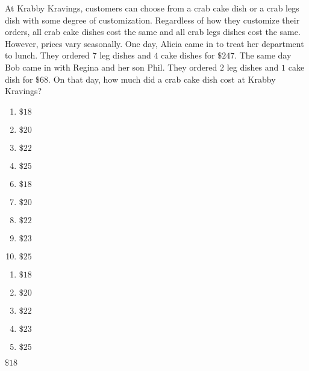  
At Krabby Kravings, customers can choose from a crab cake dish or a crab legs dish with some degree of customization.  Regardless of how they customize their orders, all crab cake dishes cost the same and all crab legs dishes cost the same.  However, prices vary seasonally.  One day, Alicia came in to treat her department to lunch.  They ordered $7$ leg dishes and $4$ cake dishes for $\$247$.  The same day Bob came in with Regina and her son Phil.  They ordered $2$ leg dishes and $1$ cake dish for $\$68$.  On that day, how much did a crab cake dish cost at Krabby Kravings?


\ifsat
	\begin{enumerate}[label=\Alph*)]
		\item $\$18 $ %
		\item $\$20 $ 
		\item $\$22 $ 
		\item $\$25 $
	\end{enumerate}
\else
\fi

\ifacteven
	\begin{enumerate}[label=\textbf{\Alph*.},itemsep=\fill,align=left]
		\setcounter{enumii}{5}
		\item $\$18 $ %
		\item $\$20 $ 
		\item $\$22 $ 
		\addtocounter{enumii}{1}
		\item $\$23 $
		\item $\$25 $
	\end{enumerate}
\else
\fi

\ifactodd
	\begin{enumerate}[label=\textbf{\Alph*.},itemsep=\fill,align=left]
		\item $\$18 $ %
		\item $\$20 $ 
		\item $\$22 $ 
		\item $\$23 $
		\item $\$25 $
	\end{enumerate}
\else
\fi

\ifgridin
 $\$18 $ %
		
\else
\fi

